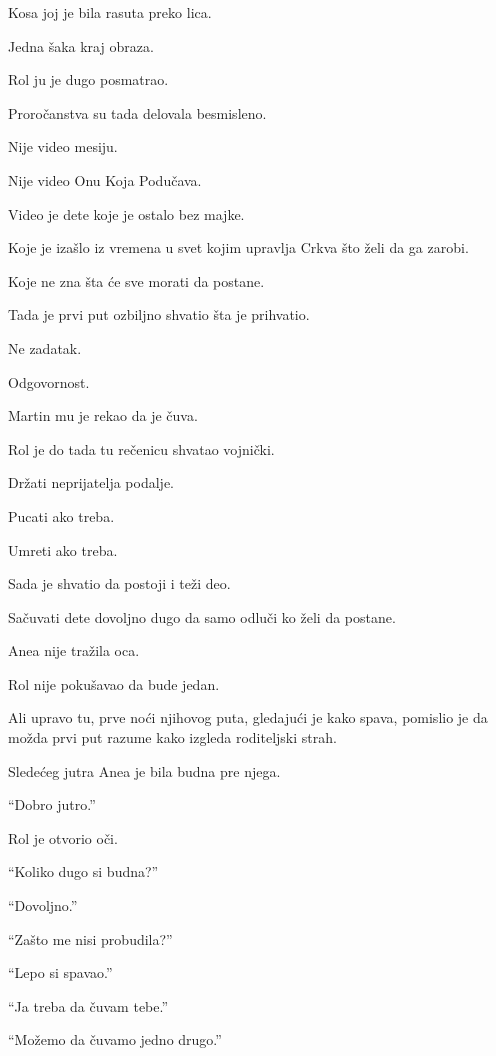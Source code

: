 Kosa joj je bila rasuta preko lica.

Jedna šaka kraj obraza.

\bigskip

Rol ju je dugo posmatrao.

Proročanstva su tada delovala besmisleno.

Nije video mesiju.

Nije video Onu Koja Podučava.

Video je dete koje je ostalo bez majke.

Koje je izašlo iz vremena u svet kojim upravlja Crkva što želi da ga zarobi.

Koje ne zna šta će sve morati da postane.

\bigskip

Tada je prvi put ozbiljno shvatio šta je prihvatio.

Ne zadatak.

Odgovornost.

\bigskip

Martin mu je rekao da je čuva.

Rol je do tada tu rečenicu shvatao vojnički.

Držati neprijatelja podalje.

Pucati ako treba.

Umreti ako treba.

\bigskip

Sada je shvatio da postoji i teži deo.

Sačuvati dete dovoljno dugo da samo odluči ko želi da postane.

\bigskip

Anea nije tražila oca.

Rol nije pokušavao da bude jedan.

Ali upravo tu, prve noći njihovog puta, gledajući je kako spava, pomislio je da možda prvi put razume kako izgleda roditeljski strah.

\bigskip

Sledećeg jutra Anea je bila budna pre njega.

``Dobro jutro.''

Rol je otvorio oči.

``Koliko dugo si budna?''

``Dovoljno.''

``Zašto me nisi probudila?''

``Lepo si spavao.''

``Ja treba da čuvam tebe.''

``Možemo da čuvamo jedno drugo.''

